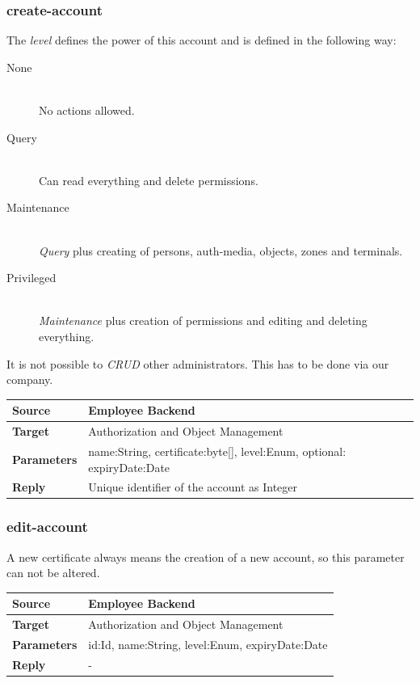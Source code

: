 \documentclass[12pt,a4paper,titlepage,oneside]{scrartcl}
\begin{document}
\subsubsection{create-account}
The \emph{level} defines the power of this account and is defined in the following way:

\begin{description}
  \item[None] \hfill \\
  No actions allowed.
  \item[Query] \hfill \\
  Can read everything and delete permissions.
  \item[Maintenance] \hfill \\
  \emph{Query} plus creating of persons, auth-media, objects, zones and terminals.
  \item[Privileged] \hfill \\
  \emph{Maintenance} plus creation of permissions and editing and deleting everything.
\end{description}

It is not possible to \emph{CRUD} other administrators. This has to be done via our company.

\begin{table}[h]
    \centering
    \begin{tabular}{|l|p{12cm}|} \hline
    \textbf{Source}&Employee Backend\\ \hline
    \textbf{Target}&Authorization and Object Management\\ \hline
    \textbf{Parameters}&name:String, certificate:byte[], level:Enum, optional: expiryDate:Date\\ \hline
    \textbf{Reply}&Unique identifier of the account as Integer\\ \hline
    \end{tabular}
\end{table}

\subsubsection{edit-account}
A new certificate always means the creation of a new account, so this parameter can not be altered.

\begin{table}[h]
    \centering
    \begin{tabular}{|l|p{12cm}|} \hline
    \textbf{Source}&Employee Backend\\ \hline
    \textbf{Target}&Authorization and Object Management\\ \hline
    \textbf{Parameters}&id:Id, name:String, level:Enum, expiryDate:Date\\ \hline
    \textbf{Reply}&-\\ \hline
    \end{tabular}
\end{table}
\end{document}
